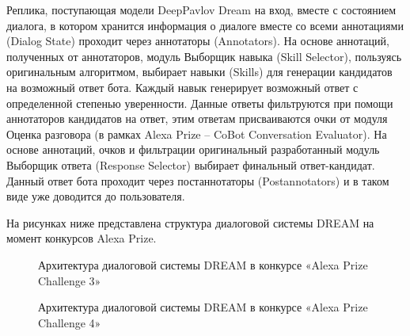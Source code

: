 Реплика, поступающая модели {DeepPavlov Dream} на вход, вместе с состоянием диалога, в котором хранится информация о диалоге вместе со всеми аннотациями (Dialog State) проходит через аннотаторы (Annotators). На основе аннотаций, полученных от аннотаторов, модуль Выборщик навыка (Skill Selector), пользуясь оригинальным алгоритмом, выбирает навыки (Skills) для генерации кандидатов на возможный ответ бота. Каждый навык генерирует возможный ответ с определенной степенью уверенности. Данные ответы фильтруются при помощи аннотаторов кандидатов на ответ, этим ответам присваиваются очки от модуля Оценка разговора (в рамках Alexa Prize -- CoBot Conversation Evaluator). На основе аннотаций, очков и фильтрации оригинальный разработанный модуль Выборщик ответа (Response Selector) выбирает финальный ответ-кандидат. Данный ответ бота проходит через постаннотаторы (Postannotators) и в таком виде уже доводится до пользователя.

На рисунках ниже представлена структура диалоговой системы DREAM на момент конкурсов Alexa Prize. 

\begin{figure}[ht]
  \caption{Архитектура диалоговой системы {DREAM} в конкурсе «Alexa Prize Challenge 3»}\label{fig:Alexa1}
\end{figure}

\begin{figure}[ht]
  \caption{Архитектура диалоговой системы {DREAM} в конкурсе «Alexa Prize Challenge 4»}\label{fig:Alexa2}
\end{figure}

